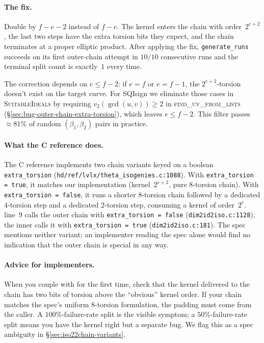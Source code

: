 \paragraph{The fix.}
Double by $f - e - 2$ instead of $f - e$.  The kernel enters the
chain with order~$2^{e+2}$, the last two steps have the extra
torsion bits they expect, and the chain terminates at a proper
elliptic product.  After applying the fix,
\texttt{generate\_runs} succeeds on its first outer-chain attempt
in $10/10$ consecutive runs and the terminal split count is
exactly~$1$ every time.

The correction depends on $e \le f - 2$: if $e = f$ or $e = f - 1$,
the $2^{e+2}$-torsion doesn't exist on the target curve.  For
SQIsign we eliminate those cases in \textsc{SuitableIdeals} by
requiring $v_2(\gcd(u,v)) \ge 2$ in \textsc{find\_uv\_from\_lists}
(§\ref{sec:bug-outer-chain-extra-torsion}), which leaves
$e \le f - 2$.  This filter passes~$\approx 81\%$ of random
$(\beta_1, \beta_2)$ pairs in practice.

\paragraph{What the C reference does.}
The C reference implements two chain variants keyed on a boolean
\texttt{extra\_torsion}
(\texttt{hd/ref/lvlx/theta\_isogenies.c:1088}).  With
\texttt{extra\_torsion = true}, it matches our implementation
(kernel~$2^{e+2}$, pure 8-torsion chain).  With
\texttt{extra\_torsion = false}, it runs a shorter 8-torsion
chain followed by a dedicated 4-torsion step and a dedicated
2-torsion step, consuming a kernel of order~$2^e$.  
line~9 calls the outer chain with
\texttt{extra\_torsion = false} (\texttt{dim2id2iso.c:1128}); the
inner  calls it with
\texttt{extra\_torsion = true} (\texttt{dim2id2iso.c:181}).  The
spec mentions neither variant; an implementer reading the spec
alone would find no indication that the outer chain is special
in any way.

\paragraph{Advice for implementers.}
When you couple  with  for the first time,
check that the kernel delivered to the chain has two bits of
torsion above the ``obvious'' kernel order.  If your chain
matches the spec's uniform 8-torsion formulation, the padding
must come from the caller.  A $100\%$-failure-rate split is the
visible symptom; a $50\%$-failure-rate split means you have the
kernel right but a separate bug.  We flag this as a spec
ambiguity in §\ref{sec:iso22chain-variants}.


